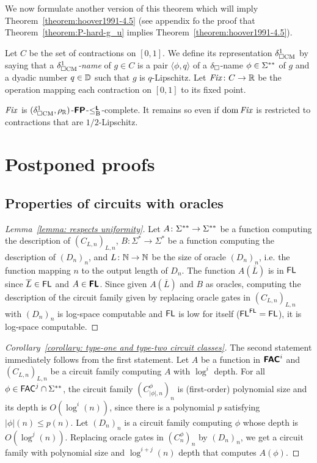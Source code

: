 \documentclass[envcountsame,orivec,oribibl]{llncs}
\begin{document}
We now formulate another version of this theorem which 
will imply Theorem~\ref{theorem:hoover1991-4.5}
(see appendix fo the proof that Theorem~\ref{theorem:P-hard-g_u} 
implies Theorem~\ref{theorem:hoover1991-4.5}). 

Let $C$ be the set of contractions on $[0, 1]$. 
We define its representation $\delta _{\square \mathrm{CM}}^1$ by saying that 
a \emph{$\delta _{\square \mathrm{CM}}^1$-name} of $g \in C$
is a pair $\langle \phi, q \rangle$ of 
a $\delta _\square$-name $\phi \in \Sigma ^{**}$ of $g$ 
and a dyadic number $q \in \mathbb D$ such that $g$ is $q$-Lipschitz. 
Let $\mathit{Fix} \colon C \to \mathbb R$ be the operation 
mapping each contraction on $[0, 1]$ to its fixed point.

\begin{theorem}
\label{theorem:P-hard-g_u}
$\mathit{Fix}$ is $(\delta _{\square \mathrm{CM}}^1, \rho _\mathbb R)$-$\text{\bfseries \sffamily \upshape FP}$-$\leq _{\mathrm B} ^{\text{\bfseries \sffamily \upshape L}}$-complete. 
It remains so even if $\mathop{\rm dom} \mathit{Fix}$ is restricted to contractions 
that are $1/2$-Lipschitz.
\end{theorem}




\clearpage
\appendix
\section{Postponed proofs}

\subsection{Properties of circuits with oracles}

\begin{proof}[Lemma~\ref{lemma: respects uniformity}]
 Let $A \colon \Sigma ^{**} \to \Sigma ^{**}$ be a function computing the description of $(C_{L,n})_{L,n}$,
 $B \colon \Sigma^* \to \Sigma^*$ be a function computing the description of $(D_n)_n$, and
 $L \colon \mathbb N \to \mathbb N$ be the size of oracle $(D_n)_n$, i.e.
 the function mapping $n$ to the output length of $D_n$.
 The function $A(\overline{L})$ is in $\mathsf{FL}$ since $\overline{L} \in \mathsf{FL}$ and $A \in \text{\bfseries \sffamily \upshape FL}$.
 Since given $A(\overline{L})$ and $B$ as oracles,
 computing the description of the circuit family given by replacing oracle
 gates in $(C_{L,n})_{L,n}$ with $(D_n)_n$ is log-space computable
 and $\mathsf{FL}$ is low for itself ($\mathsf{FL}^{\mathsf{FL}} = \mathsf{FL}$),
 it is log-space computable.
\end{proof}

\begin{proof}[Corollary~\ref{corollary: type-one and type-two circuit classes}]
The second statement immediately follows from the first statement.
Let $A$ be a function in $\text{\bfseries \sffamily \upshape FAC}^i$ and $(C_{L,n})_{L,n}$ be a circuit
family computing $A$ with $\log^i$ depth.
For all $\phi \in \mathsf{FAC}^j \cap \Sigma ^{**}$, 
the circuit family $(C^\phi_{|\phi|,n})_n$ is (first-order) polynomial size and its depth is $O(\log^i(n))$,
since there is a polynomial $p$ satisfying $|\phi|(n) \le p(n)$.
Let $(D_n)_n$ is a circuit family computing $\phi$ whose depth is $O(\log^j(n))$.
Replacing oracle gates in $(C^\phi_n)_n$ by $(D_n)_n$, 
we get a circuit family with polynomial size and $\log^{i+j}(n)$ depth
that computes $A(\phi)$.
\end{proof}
\end{document}
